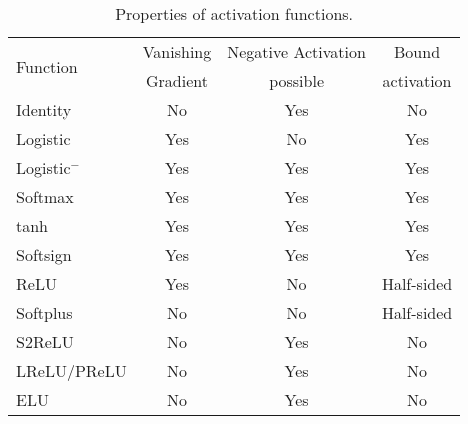 \begin{table}[H]
    \centering
    \begin{tabular}{lccc}
    \toprule
    \multirow{2}{*}{Function} & Vanishing  & Negative Activation & Bound \\
                  & Gradient       & possible & activation \\\midrule
    Identity      & \cellcolor{green!25}No    & \cellcolor{green!25}  Yes    & \cellcolor{green!25}No  \\
    Logistic      & \cellcolor{red!25} Yes    & \cellcolor{red!25}   No      & \cellcolor{red!25}  Yes \\
    Logistic$^-$  & \cellcolor{red!25} Yes    & \cellcolor{green!25}  Yes    & \cellcolor{red!25}  Yes \\
    Softmax        & \cellcolor{red!25} Yes    & \cellcolor{green!25}  Yes    & \cellcolor{red!25}  Yes \\
    tanh          & \cellcolor{red!25} Yes    & \cellcolor{green!25}  Yes    & \cellcolor{red!25}  Yes \\
    Softsign      & \cellcolor{red!25} Yes    & \cellcolor{green!25}Yes      & \cellcolor{red!25}   Yes \\
    ReLU          & \cellcolor{yellow!25}Yes\footnotemark & \cellcolor{red!25} No & \cellcolor{yellow!25}Half-sided \\
    Softplus      & \cellcolor{green!25}No    & \cellcolor{red!25}   No      & \cellcolor{yellow!25}Half-sided \\
    S2ReLU        & \cellcolor{green!25}No    & \cellcolor{green!25}Yes      & \cellcolor{green!25} No \\
    \gls{LReLU}/PReLU   & \cellcolor{green!25}No    & \cellcolor{green!25}Yes      & \cellcolor{green!25} No \\
    ELU           & \cellcolor{green!25}No    & \cellcolor{green!25}Yes      & \cellcolor{green!25} No \\
    \bottomrule
    \end{tabular}
    \caption[Activation function properties]{Properties of activation functions.}
    \label{table:properties-of-activation-functions}
\end{table}

